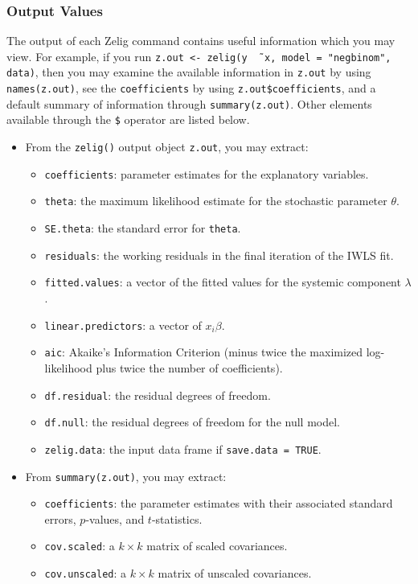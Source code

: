 \documentclass{article}
\begin{document}
\subsubsection{Output Values}

The output of each Zelig command contains useful information which you
may view.  For example, if you run \texttt{z.out <- zelig(y \~\,
  x, model = "negbinom", data)}, then you may examine the available
information in \texttt{z.out} by using \texttt{names(z.out)},
see the {\tt coefficients} by using {\tt z.out\$coefficients}, and
a default summary of information through \texttt{summary(z.out)}.
Other elements available through the {\tt \$} operator are listed
below.

\begin{itemize}
\item From the {\tt zelig()} output object {\tt z.out}, you may extract:
   \begin{itemize}
   \item {\tt coefficients}: parameter estimates for the explanatory
     variables.
   \item {\tt theta}: the maximum likelihood estimate for the
     stochastic parameter $\theta$.  
   \item {\tt SE.theta}: the standard error for {\tt theta}.  
   \item {\tt residuals}: the working residuals in the final iteration
     of the IWLS fit.
   \item {\tt fitted.values}: a vector of the fitted values for the systemic
     component $\lambda$.  
   \item {\tt linear.predictors}: a vector of $x_{i} \beta$.  
   \item {\tt aic}: Akaike's Information Criterion (minus twice the
     maximized log-likelihood plus twice the number of coefficients).
   \item {\tt df.residual}: the residual degrees of freedom.
   \item {\tt df.null}: the residual degrees of freedom for the null
     model.
   \item {\tt zelig.data}: the input data frame if {\tt save.data = TRUE}.  
   \end{itemize}

\item From {\tt summary(z.out)}, you may extract: 
   \begin{itemize}
   \item {\tt coefficients}: the parameter estimates with their
     associated standard errors, $p$-values, and $t$-statistics.
   \item{\tt cov.scaled}: a $k \times k$ matrix of scaled covariances.
   \item{\tt cov.unscaled}: a $k \times k$ matrix of unscaled
     covariances.  
   \end{itemize}


\end{itemize}
\end{document}
